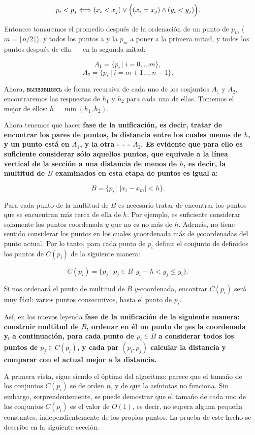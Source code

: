 $$ p_i < p_j \Longleftrightarrow (x_i < x_j) \lor \Bigl( (x_i = x_j) \land (y_i < y_j) \Bigr). $$

Entonces tomaremos el promedio después de la ordenación de un punto de $p_m$ ($m = \lfloor n/2 \rfloor$), y todos los puntos a y la $p_m$ a poner a la primera mitad, y todos los puntos después de ella --- en la segunda mitad:

$$ A_1 = \{ p_i\ |\ i = 0, \ldots m \}, $$
$$ A_2 = \{ p_i\ |\ i = m+1 \ldots, n-1 \}. $$

Ahora, вызвавшись de forma recursiva de cada uno de los conjuntos $A_1$ y $A_2$, encontraremos las respuestas de $h_1$ y $h_2$ para cada una de ellas. Tomemos el mejor de ellos: $h = \min (h_1, h_2)$.

Ahora tenemos que hacer \bf{fase de la unificación}, es decir, tratar de encontrar los pares de puntos, la distancia entre los cuales menos de $h$, y un punto está en $A_1$, y la otra - - - $A_2$. Es evidente que para ello es suficiente considerar sólo aquellos puntos, que equivale a la línea vertical de la sección a una distancia de menos de $h$, es decir, la multitud de $B$ examinados en esta etapa de puntos es igual a:

$$ B = \{ p_i\ |\ | x_i - x_m | < h \}. $$

Para cada punto de la multitud de $B$ es necesario tratar de encontrar los puntos que se encuentran más cerca de ella de $h$. Por ejemplo, es suficiente considerar solamente los puntos coordenada $y$ que no es no más de $h$. Además, no tiene sentido considerar los puntos en los cuales $y$coordenada más de $y$coordenadas del punto actual. Por lo tanto, para cada punto de $p_i$ definir el conjunto de definidos los puntos de $C(p_i)$ de la siguiente manera:

$$ C(p_i) = \{ p_j\ |\ p_j \in B\ \ y_i - h < y_j \le y_i \}. $$

Si nos ordenará el punto de multitud de $B$ $y$-coordenada, encontrar $C(p_i)$ será muy fácil: varios puntos consecutivos, hasta el punto de $p_i$.

Así, en los nuevos leyenda \bf{fase de la unificación} de la siguiente manera: construir multitud de $B$, ordenar en él un punto de $y$es la coordenada y, a continuación, para cada punto de $p_i \in B$ a considerar todos los puntos de $p_j \in C(p_i)$, y cada par $(p_i,p_j)$ calcular la distancia y comparar con el actual mejor a la distancia.

A primera vista, sigue siendo el óptimo del algoritmo: parece que el tamaño de los conjuntos $C(p_i)$ se de orden $n$, y de que la asíntotas no funciona. Sin embargo, sorprendentemente, se puede demostrar que el tamaño de cada uno de los conjuntos $C(p_i)$ es el valor de $O(1)$, es decir, no supera alguna pequeña constantes, independientemente de los propios puntos. La prueba de este hecho se describe en la siguiente sección.


